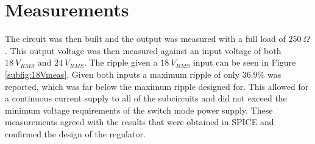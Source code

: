 \section{Measurements} \label{sec:measurements_rectifier}
The circuit was then built and the output was measured with a full load of $\SI{250}{\Omega}$. This output voltage was then measured against an input voltage of both $\SI{18}{V_{RMS}}$ and $\SI{24}{V_{RMS}}$. The ripple given a $\SI{18}{V_{RMS}}$ input can be seen in Figure \ref{subfig:18Vmeas}. Given both inputs a maximum ripple of only $36.9\%$ was reported, which was far below the maximum ripple designed for. This allowed for a continuous current supply to all of the subcircuits and did not exceed the minimum voltage requirements of the switch mode power supply. These measurements agreed with the results that were obtained in SPICE and confirmed the design of the regulator.

